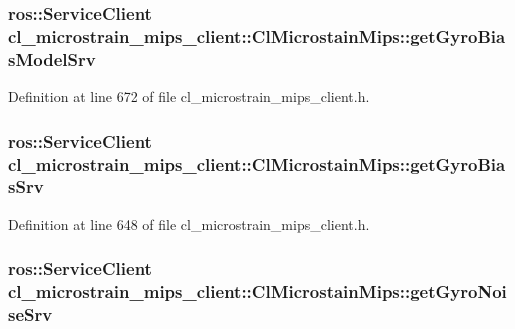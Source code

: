 \subsubsection[{\texorpdfstring{get\+Gyro\+Bias\+Model\+Srv}{getGyroBiasModelSrv}}]{\setlength{\rightskip}{0pt plus 5cm}ros\+::\+Service\+Client cl\+\_\+microstrain\+\_\+mips\+\_\+client\+::\+Cl\+Microstain\+Mips\+::get\+Gyro\+Bias\+Model\+Srv\hspace{0.3cm}{\ttfamily [protected]}}\hypertarget{classcl__microstrain__mips__client_1_1ClMicrostainMips_acc435ae8dd2cabd66590f2575373a2bf}{}\label{classcl__microstrain__mips__client_1_1ClMicrostainMips_acc435ae8dd2cabd66590f2575373a2bf}


Definition at line 672 of file cl\+\_\+microstrain\+\_\+mips\+\_\+client.\+h.

\subsubsection[{\texorpdfstring{get\+Gyro\+Bias\+Srv}{getGyroBiasSrv}}]{\setlength{\rightskip}{0pt plus 5cm}ros\+::\+Service\+Client cl\+\_\+microstrain\+\_\+mips\+\_\+client\+::\+Cl\+Microstain\+Mips\+::get\+Gyro\+Bias\+Srv\hspace{0.3cm}{\ttfamily [protected]}}\hypertarget{classcl__microstrain__mips__client_1_1ClMicrostainMips_ad690945c866bb3e3b5e465bb838bacef}{}\label{classcl__microstrain__mips__client_1_1ClMicrostainMips_ad690945c866bb3e3b5e465bb838bacef}


Definition at line 648 of file cl\+\_\+microstrain\+\_\+mips\+\_\+client.\+h.

\subsubsection[{\texorpdfstring{get\+Gyro\+Noise\+Srv}{getGyroNoiseSrv}}]{\setlength{\rightskip}{0pt plus 5cm}ros\+::\+Service\+Client cl\+\_\+microstrain\+\_\+mips\+\_\+client\+::\+Cl\+Microstain\+Mips\+::get\+Gyro\+Noise\+Srv\hspace{0.3cm}{\ttfamily [protected]}}\hypertarget{classcl__microstrain__mips__client_1_1ClMicrostainMips_a1e6400fa4d1a3a0ccdfa0e8064c4a62c}{}\label{classcl__microstrain__mips__client_1_1ClMicrostainMips_a1e6400fa4d1a3a0ccdfa0e8064c4a62c}


